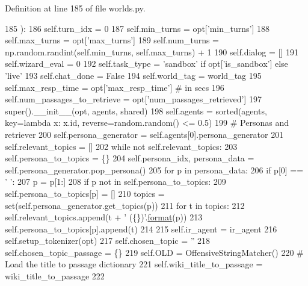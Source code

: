 Definition at line 185 of file worlds.\+py.


\begin{DoxyCode}
185     ):
186         self.turn\_idx = 0
187         self.min\_turns = opt[\textcolor{stringliteral}{'min\_turns'}]
188         self.max\_turns = opt[\textcolor{stringliteral}{'max\_turns'}]
189         self.num\_turns = np.random.randint(self.min\_turns, self.max\_turns) + 1
190         self.dialog = []
191         self.wizard\_eval = 0
192         self.task\_type = \textcolor{stringliteral}{'sandbox'} \textcolor{keywordflow}{if} opt[\textcolor{stringliteral}{'is\_sandbox'}] \textcolor{keywordflow}{else} \textcolor{stringliteral}{'live'}
193         self.chat\_done = \textcolor{keyword}{False}
194         self.world\_tag = world\_tag
195         self.max\_resp\_time = opt[\textcolor{stringliteral}{'max\_resp\_time'}]  \textcolor{comment}{# in secs}
196         self.num\_passages\_to\_retrieve = opt[\textcolor{stringliteral}{'num\_passages\_retrieved'}]
197         super().\_\_init\_\_(opt, agents, shared)
198         self.agents = sorted(agents, key=\textcolor{keyword}{lambda} x: x.id, reverse=random.random() <= 0.5)
199         \textcolor{comment}{#  Personas and retriever}
200         self.persona\_generator = self.agents[0].persona\_generator
201         self.relevant\_topics = []
202         \textcolor{keywordflow}{while} \textcolor{keywordflow}{not} self.relevant\_topics:
203             self.persona\_to\_topics = \{\}
204             self.persona\_idx, persona\_data = self.persona\_generator.pop\_persona()
205             \textcolor{keywordflow}{for} p \textcolor{keywordflow}{in} persona\_data:
206                 \textcolor{keywordflow}{if} p[0] == \textcolor{stringliteral}{' '}:
207                     p = p[1:]
208                 \textcolor{keywordflow}{if} p \textcolor{keywordflow}{not} \textcolor{keywordflow}{in} self.persona\_to\_topics:
209                     self.persona\_to\_topics[p] = []
210                     topics = set(self.persona\_generator.get\_topics(p))
211                     \textcolor{keywordflow}{for} t \textcolor{keywordflow}{in} topics:
212                         self.relevant\_topics.append(t + \textcolor{stringliteral}{' (\{\})'}.\hyperlink{namespaceparlai_1_1chat__service_1_1services_1_1messenger_1_1shared__utils_a32e2e2022b824fbaf80c747160b52a76}{format}(p))
213                         self.persona\_to\_topics[p].append(t)
214 
215         self.ir\_agent = ir\_agent
216         self.setup\_tokenizer(opt)
217         self.chosen\_topic = \textcolor{stringliteral}{''}
218         self.chosen\_topic\_passage = \{\}
219         self.OLD = OffensiveStringMatcher()
220         \textcolor{comment}{# Load the title to passage dictionary}
221         self.wiki\_title\_to\_passage = wiki\_title\_to\_passage
222 
\end{DoxyCode}


